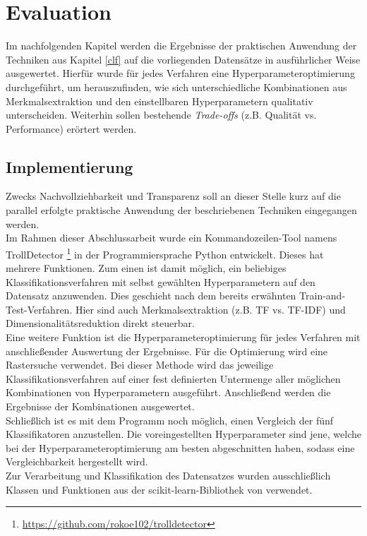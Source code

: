 \section{Evaluation}\raggedbottom
Im nachfolgenden Kapitel werden die Ergebnisse der praktischen Anwendung der Techniken aus Kapitel \ref{clf} auf die vorliegenden Datensätze in ausführlicher Weise ausgewertet. Hierfür wurde für jedes Verfahren eine Hyperparameteroptimierung durchgeführt, um herauszufinden, wie sich unterschiedliche Kombinationen aus  Merkmalsextraktion und den einstellbaren Hyperparametern qualitativ unterscheiden. Weiterhin sollen bestehende \textit{Trade-offs} (z.B. Qualität vs. Performance) erörtert werden.
\subsection{Implementierung} 
Zwecks Nachvollziehbarkeit und Transparenz soll an dieser Stelle kurz auf die parallel erfolgte praktische Anwendung der beschriebenen Techniken eingegangen werden.\\
Im Rahmen dieser Abschlussarbeit wurde ein Kommandozeilen-Tool namens \glqq TrollDetector\grqq{} \footnote{\url{https://github.com/rokoe102/trolldetector}} in der Programmiersprache Python entwickelt. Dieses hat mehrere Funktionen. Zum einen ist damit möglich, ein beliebiges Klassifikationsverfahren mit selbst gewählten Hyperparametern auf den Datensatz anzuwenden. Dies geschieht nach dem bereits erwähnten \glqq Train-and-Test\grqq-Verfahren. Hier sind auch Merkmalsextraktion (z.B. TF vs. TF-IDF) und Dimensionalitätsreduktion direkt steuerbar.\\
Eine weitere Funktion ist die Hyperparameteroptimierung für jedes Verfahren mit anschließender Auswertung der Ergebnisse. Für die Optimierung wird eine Rastersuche verwendet. Bei dieser Methode wird das jeweilige Klassifikationsverfahren auf einer fest definierten Untermenge aller möglichen Kombinationen von Hyperparametern ausgeführt. Anschließend werden die Ergebnisse der Kombinationen ausgewertet.\\
Schließlich ist es mit dem Programm noch möglich, einen Vergleich der fünf Klassifikatoren anzustellen. Die voreingestellten Hyperparameter sind jene, welche bei der Hyperparameteroptimierung am besten abgeschnitten haben, sodass eine Vergleichbarkeit hergestellt wird.\\
Zur Verarbeitung und Klassifikation des Datensatzes wurden ausschließlich Klassen und Funktionen aus der \glqq scikit-learn\grqq-Bibliothek von \citet{scikit-learn} verwendet.
\pagebreak\pagebreak

